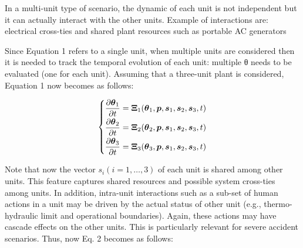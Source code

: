 In a multi-unit type of scenario, the dynamic of each unit is not independent but it can actually 
interact with the other units. Example of interactions are: electrical cross-ties and shared plant 
resources such as portable AC generators

Since Equation 1 refers to a single unit, when multiple units are considered then it is needed to track 
the temporal evolution of each unit: multiple θ needs to be evaluated (one for each unit). 
Assuming that a three-unit plant is considered, Equation 1 now becomes as follows:

\begin{equation}
  \begin{matrix}
     \begin{dcases*}
       \frac{\partial \boldsymbol{\theta}_1}{\partial t}  = \boldsymbol{\Xi}_1 (\boldsymbol{\theta}_1 , \boldsymbol p, \boldsymbol{s}_1 , \boldsymbol{s}_2 , \boldsymbol{s}_3, t)  \\     
       \frac{\partial \boldsymbol{\theta}_2}{\partial t}  = \boldsymbol{\Xi}_2 (\boldsymbol{\theta}_2 , \boldsymbol p, \boldsymbol{s}_1 , \boldsymbol{s}_2 , \boldsymbol{s}_3, t)  \\   
       \frac{\partial \boldsymbol{\theta}_3}{\partial t}  = \boldsymbol{\Xi}_3 (\boldsymbol{\theta}_3 , \boldsymbol p, \boldsymbol{s}_1 , \boldsymbol{s}_2 , \boldsymbol{s}_3, t)  \\       
     \end{dcases*}
  \end{matrix}
  \label{eq:MU_looseCoupled}
\end{equation}

Note that now the vector $s_i (i=1,…,3)$ of each unit is shared among other units. This feature 
captures shared resources and possible system cross-ties among units.
In addition, intra-unit interactions such as a sub-set of human actions in a unit may be driven 
by the actual status of other unit (e.g., thermo-hydraulic limit and operational boundaries). 
Again, these actions may have cascade effects on the other units. This is particularly relevant 
for severe accident scenarios. Thus, now Eq. 2 becomes as follows:

